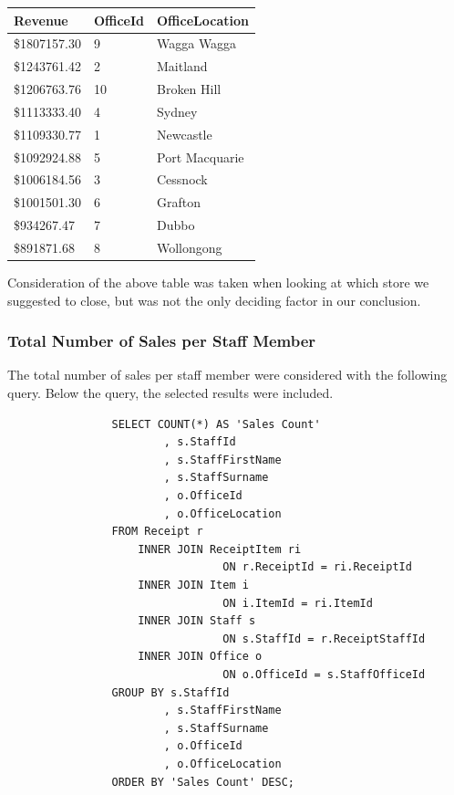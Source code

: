 \documentclass{article}
\begin{document}
            \begin{table}[H]
                \centering
                \begin{tabular}{|l|l|l|}
                \hline
                Revenue       & OfficeId & OfficeLocation \\ \hline
                \$1807157.30 & 9        & Wagga Wagga    \\ \hline
                \$1243761.42 & 2        & Maitland       \\ \hline
                \$1206763.76 & 10       & Broken Hill    \\ \hline
                \$1113333.40 & 4        & Sydney         \\ \hline
                \$1109330.77 & 1        & Newcastle      \\ \hline
                \$1092924.88 & 5        & Port Macquarie \\ \hline
                \$1006184.56 & 3        & Cessnock       \\ \hline
                \$1001501.30 & 6        & Grafton        \\ \hline
                \$934267.47  & 7        & Dubbo          \\ \hline
                \$891871.68  & 8        & Wollongong     \\ \hline
                \end{tabular}
            \end{table}

            \noindent
            Consideration of the above table was taken when looking at which
            store we suggested to close, but was not the only deciding factor 
            in our conclusion. 

\newpage

            \subsubsection{Total Number of Sales per Staff Member}
                The total number of sales per staff member were considered with the following 
                query. Below the query, the selected results were included.
                \begin{lstlisting}
				SELECT COUNT(*) AS 'Sales Count'
						, s.StaffId
						, s.StaffFirstName
						, s.StaffSurname
						, o.OfficeId
						, o.OfficeLocation
				FROM Receipt r
					INNER JOIN ReceiptItem ri
								 ON r.ReceiptId = ri.ReceiptId
					INNER JOIN Item i
								 ON i.ItemId = ri.ItemId
					INNER JOIN Staff s
								 ON s.StaffId = r.ReceiptStaffId
					INNER JOIN Office o
								 ON o.OfficeId = s.StaffOfficeId
				GROUP BY s.StaffId
						, s.StaffFirstName
						, s.StaffSurname
						, o.OfficeId
						, o.OfficeLocation
				ORDER BY 'Sales Count' DESC;
                \end{lstlisting}
\end{document}

